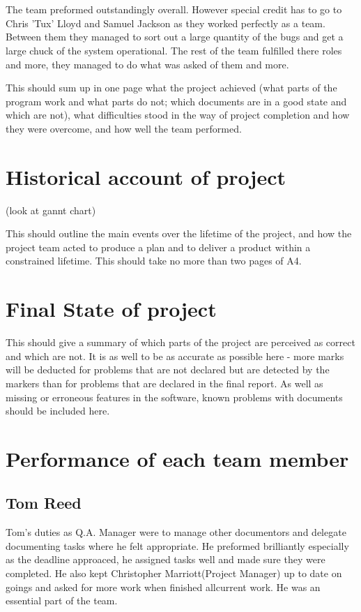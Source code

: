 \documentclass{project}
\begin{document}
\\
\\
The team preformed outstandingly overall. However special credit has to go to Chris 'Tux' Lloyd and Samuel Jackson as they worked perfectly as a team. Between them they managed to sort out a large quantity of the bugs and get a large chuck of the system operational. The rest of the team fulfilled there roles and more, they managed to do what was asked of them and more. 

This should sum up in one page what the project achieved (what parts of the program
work and what parts do not; which documents are in a good state and which are not), what difficulties stood in
the way of project completion and how they were overcome, and how well the team performed.

\section{Historical account of project}
(look at gannt chart)

This should outline the main events over the lifetime of the project, and how
the project team acted to produce a plan and to deliver a product within a constrained lifetime. This should take
no more than two pages of A4.

\section{Final State of project}

This should give a summary of which parts of the project are perceived as correct and
which are not. It is as well to be as accurate as possible here - more marks will be deducted for problems that are
not declared but are detected by the markers than for problems that are declared in the final report. As well as
missing or erroneous features in the software, known problems with documents should be included here.

\section{Performance of each team member}
\subsection{Tom Reed}
Tom's duties as Q.A. Manager were to manage other documentors and delegate documenting tasks where he felt appropriate. He preformed brilliantly especially as the deadline approaced, he assigned tasks well and made sure they were completed. He also kept Christopher Marriott(Project Manager) up to date on goings and asked for more work when finished allcurrent work. He was an essential part of the team. 
\end{document}
